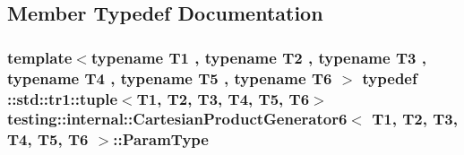 \subsection{Member Typedef Documentation}
\hypertarget{classtesting_1_1internal_1_1CartesianProductGenerator6_a308164858b18868e45abab2f168b92db}{
\subsubsection[{Param\-Type}]{\setlength{\rightskip}{0pt plus 5cm}template$<$typename T1 , typename T2 , typename T3 , typename T4 , typename T5 , typename T6 $>$ typedef \-::{\bf std\-::tr1\-::tuple}$<$T1, T2, T3, T4, T5, T6$>$ {\bf testing\-::internal\-::\-Cartesian\-Product\-Generator6}$<$ T1, T2, T3, T4, T5, T6 $>$\-::{\bf Param\-Type}}}\label{classtesting_1_1internal_1_1CartesianProductGenerator6_a308164858b18868e45abab2f168b92db}


